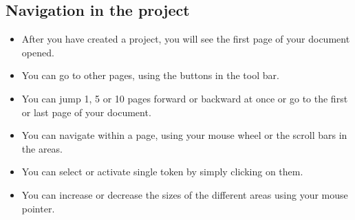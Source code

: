 \subsection{Navigation in the project}
\begin{frame}
	\begin{itemize}
		\item After you have created a project, you will see the first page of
			your document opened.
		\item You can go to other pages, using the buttons in the tool bar.
		\item You can jump 1, 5 or 10 pages forward or backward at once or go to
			the first or last page of your document.
		\item You can navigate within a page, using your mouse wheel or the
			scroll bars in the areas.
		\item You can select or activate single token by simply clicking on them.
		\item You can increase or decrease the sizes of the different areas using
			your mouse pointer.
	\end{itemize}
\end{frame}

